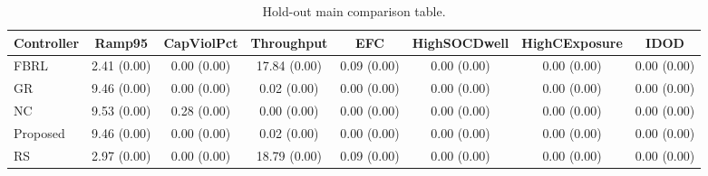 \begin{table}[t]
\centering
\caption{Hold-out main comparison table.}
\label{tab:holdout_main_auto}
\begin{tabular}{lccccccc}
\toprule
Controller & Ramp95 & CapViolPct & Throughput & EFC & HighSOCDwell & HighCExposure & IDOD \\
\midrule
FBRL & 2.41 (0.00) & 0.00 (0.00) & 17.84 (0.00) & 0.09 (0.00) & 0.00 (0.00) & 0.00 (0.00) & 0.00 (0.00) \\
GR & 9.46 (0.00) & 0.00 (0.00) & 0.02 (0.00) & 0.00 (0.00) & 0.00 (0.00) & 0.00 (0.00) & 0.00 (0.00) \\
NC & 9.53 (0.00) & 0.28 (0.00) & 0.00 (0.00) & 0.00 (0.00) & 0.00 (0.00) & 0.00 (0.00) & 0.00 (0.00) \\
Proposed & 9.46 (0.00) & 0.00 (0.00) & 0.02 (0.00) & 0.00 (0.00) & 0.00 (0.00) & 0.00 (0.00) & 0.00 (0.00) \\
RS & 2.97 (0.00) & 0.00 (0.00) & 18.79 (0.00) & 0.09 (0.00) & 0.00 (0.00) & 0.00 (0.00) & 0.00 (0.00) \\
\bottomrule
\end{tabular}
\end{table}